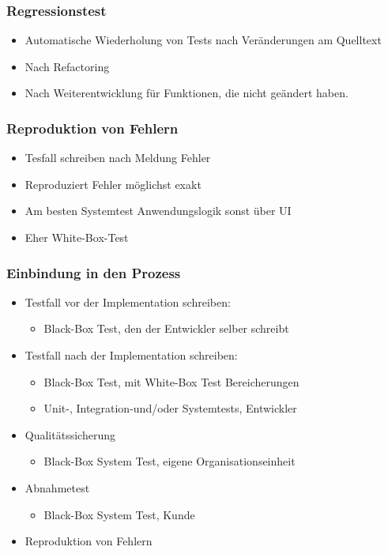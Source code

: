 \documentclass[../ZF_SWEN1.tex]{subfiles}
\begin{document}
\subsubsection{Regressionstest}
\begin{itemize}
	\item Automatische Wiederholung von Tests nach Veränderungen am Quelltext
	\item Nach Refactoring
	\item Nach Weiterentwicklung für Funktionen, die nicht geändert haben.
\end{itemize}

\subsubsection{Reproduktion von Fehlern}
\begin{itemize}
	\item Tesfall schreiben nach Meldung Fehler
	\item Reproduziert Fehler möglichst exakt
	\item Am besten Systemtest Anwendungslogik sonst über UI
	\item Eher White-Box-Test
\end{itemize}

\subsubsection{Einbindung in den Prozess}
\begin{itemize}
	\item Testfall vor der Implementation schreiben:
	\begin{itemize}
		\item Black-Box Test, den der Entwickler selber schreibt
	\end{itemize}

	\item Testfall nach der Implementation schreiben:
		\begin{itemize}
		\item Black-Box Test, mit White-Box Test Bereicherungen
		\item Unit-, Integration-und/oder Systemtests, Entwickler
	\end{itemize}
	\item Qualitätssicherung
	\begin{itemize}
		\item Black-Box System Test, eigene Organisationseinheit
	\end{itemize}
	\item Abnahmetest
	\begin{itemize}
		\item Black-Box System Test, Kunde
	\end{itemize}
	\item Reproduktion von Fehlern
\end{itemize}
\end{document}
